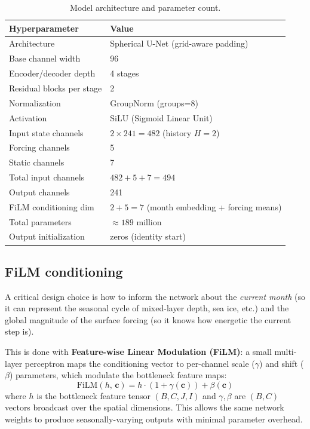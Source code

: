 \documentclass[11pt]{article}
\begin{document}
\begin{table}[h]
\centering
\caption{Model architecture and parameter count.}
\label{tab:arch}
\begin{tabular}{ll}
\toprule
Hyperparameter & Value \\
\midrule
Architecture & Spherical U-Net (grid-aware padding) \\
Base channel width & 96 \\
Encoder/decoder depth & 4 stages \\
Residual blocks per stage & 2 \\
Normalization & GroupNorm (groups=8) \\
Activation & SiLU (Sigmoid Linear Unit) \\
Input state channels & $2\times241=482$ (history $H=2$) \\
Forcing channels & 5 \\
Static channels & 7 \\
Total input channels & $482+5+7=494$ \\
Output channels & 241 \\
FiLM conditioning dim & $2+5=7$ (month embedding + forcing means) \\
Total parameters & $\approx189$ million \\
Output initialization & zeros (identity start) \\
\bottomrule
\end{tabular}
\end{table}

\subsection{FiLM conditioning}
\label{sec:film}
A critical design choice is how to inform the network about the \emph{current
month} (so it can represent the seasonal cycle of mixed-layer depth, sea ice,
etc.) and the global magnitude of the surface forcing (so it knows how energetic
the current step is).

This is done with \textbf{Feature-wise Linear Modulation (FiLM)}: a small
multi-layer perceptron maps the conditioning vector to per-channel scale
($\gamma$) and shift ($\beta$) parameters, which modulate the bottleneck
feature maps:
\begin{equation}
\text{FiLM}(h,\,\mathbf{c}) = h\cdot(1+\gamma(\mathbf{c})) + \beta(\mathbf{c})
\end{equation}
where $h$ is the bottleneck feature tensor $(B,C,J,I)$ and $\gamma,\beta$
are $(B,C)$ vectors broadcast over the spatial dimensions. This allows the
same network weights to produce seasonally-varying outputs with minimal
parameter overhead.
\end{document}
